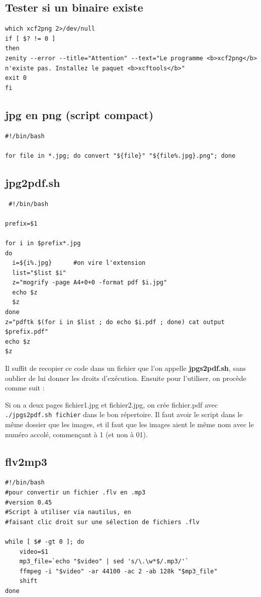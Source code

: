 \documentclass[a4paper,twoside]{article}
\begin{document}
\subsection{Tester si un binaire existe}
\begin{verbatim}
which xcf2png 2>/dev/null
if [ $? != 0 ]
then
zenity --error --title="Attention" --text="Le programme <b>xcf2png</b> n'existe pas. Installez le paquet <b>xcftools</b>"
exit 0
fi
\end{verbatim}


\subsection{jpg en png (script compact)}
\begin{verbatim}
#!/bin/bash

for file in *.jpg; do convert "${file}" "${file%.jpg}.png"; done
\end{verbatim}


\subsection{jpg2pdf.sh}
\begin{verbatim}
 #!/bin/bash

prefix=$1

for i in $prefix*.jpg
do
  i=${i%.jpg}      #on vire l'extension
  list="$list $i"
  z="mogrify -page A4+0+0 -format pdf $i.jpg"
  echo $z
  $z
done
z="pdftk $(for i in $list ; do echo $i.pdf ; done) cat output $prefix.pdf"
echo $z
$z
\end{verbatim}
Il suffit de recopier ce code dans un fichier que l'on appelle \textbf{jpgs2pdf.sh}, sans oublier de lui donner les droits d'exécution. Ensuite pour l'utiliser, on procède comme suit :

Si on a deux pages fichier1.jpg et fichier2.jpg, on crée fichier.pdf avec \verb|./jpgs2pdf.sh fichier| dans le bon répertoire.
Il faut avoir le script dans le même dossier que les images, et il faut que les images aient le même nom avec le numéro accolé, commençant à 1 (et non à 01).

\subsection{flv2mp3}
\begin{verbatim}
#!/bin/bash
#pour convertir un fichier .flv en .mp3
#version 0.45
#Script à utiliser via nautilus, en
#faisant clic droit sur une sélection de fichiers .flv

while [ $# -gt 0 ]; do
	video=$1
	mp3_file=`echo "$video" | sed 's/\.\w*$/.mp3/'`
	ffmpeg -i "$video" -ar 44100 -ac 2 -ab 128k "$mp3_file"
	shift
done
\end{verbatim}
\end{document}
